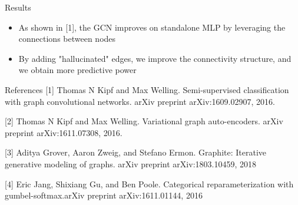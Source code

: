 \documentclass[final]{beamer}
\begin{document}
\begin{frame}[fragile]{}
\begin{textblock}{\colwidth}
\begin{paddedBlock}{Results}
\begin{itemize}
  \item As shown in [1], the GCN improves on standalone MLP by leveraging the connections between nodes
  \item By adding "hallucinated" edges, we improve the connectivity structure, and we obtain more predictive power
\end{itemize}

\end{paddedBlock}


\begin{paddedBlock}{References}
\footnotesize{[1] Thomas N Kipf and Max Welling. Semi-supervised classification with graph convolutional
networks. arXiv preprint arXiv:1609.02907, 2016.}

\footnotesize{[2] Thomas N Kipf and Max Welling. Variational graph auto-encoders. arXiv preprint
arXiv:1611.07308, 2016.}

\footnotesize{[3] Aditya Grover, Aaron Zweig, and Stefano Ermon. Graphite: Iterative generative modeling of
graphs. arXiv preprint arXiv:1803.10459, 2018}

\footnotesize{[4] Eric Jang, Shixiang Gu, and Ben Poole. Categorical reparameterization with gumbel-softmax.arXiv preprint arXiv:1611.01144, 2016}

\end{paddedBlock}
\end{textblock}






\end{frame}
\end{document}
